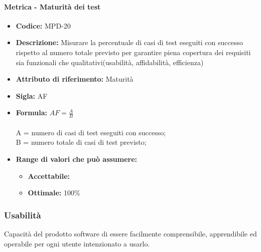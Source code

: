                   \paragraph{Metrica - Maturità dei test} 
            \begin{itemize}
           \item   \textbf{Codice:} MPD-20
            \item  \textbf{Descrizione:} Misurare la percentuale di casi di test eseguiti con successo rispetto al numero totale previsto per garantire piena copertura dei requisiti sia funzionali che qualitativi(usabilità, affidabilità, efficienza)
              \item   \textbf{Attributo di riferimento:} Maturità
          \item    \textbf{Sigla:} AF
           \item   \textbf{Formula:} \begin{math}AF = \frac{A}{B}\end{math}\\ \\
            A = numero di casi di test eseguiti con successo;\\
            B = numero totale di casi di test previsto;
            \item \textbf{Range di valori che può assumere:}
        \begin{itemize}
            \item \textbf{Accettabile:} 
            \item \textbf{Ottimale:} 100\%
        \end{itemize}
       \end{itemize}
       
              \subsubsection{Usabilità}
   Capacità del prodotto software di essere facilmente comprensibile, apprendibile ed operabile per ogni utente intenzionato a usarlo.
   
